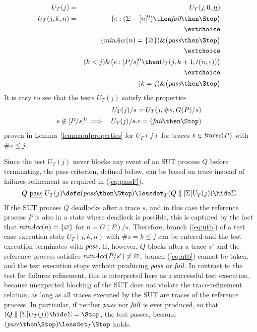 \begin{eqnarray}
U_T(j) & = & U_T(j,0,\ii n)
\\
U_T(j,k,n) & = & \big(  e:(\Sigma - [n]^0)   \then \efail\then \Stop \big)
\label{eq:uta}
\\ & & \extchoice \nonumber
\\ & & (\minaccs(n) = \{ \varnothing \})   \&   \big( \epass \then \Stop \big)
\label{eq:utb}
\\ & & \extchoice \nonumber
\\ & & (k < j) \& \big( e:[P/s]^0   \then U_T(j,k+1,t(n,e)) \big)
\label{eq:utc}
\\ & & \extchoice \nonumber
\\ & & (k = j) \& \big( \epass\then \Stop  \big)
\label{eq:utd}
\end{eqnarray}
%
It is easy to see that the tests $U_T(j)$ satisfy the properties
\begin{eqnarray}
\label{eq:ifpaT}
  &  & U_T(j)/s = U_T(j,\#s,G(P)/s)
\\
\label{eq:ifpbT}
e\not\in [P/s]^0 & \implies & U_T(j)/s.e = (\efail\then\Stop)
\end{eqnarray}
proven in Lemma~\ref{lemma:ufproperties} for $U_F(j)$ for traces
$s\in\text{\it traces}(P)$ with $\#s \le j$.


Since the test $U_T(j)$ never blocks any event of an SUT process $Q$ before
terminating, the pass criterion, defined below, can be based on
trace instead of failures refinement as required in (\ref{eq:passF}).
%
\begin{equation}
\label{eq:passT}
Q\ \pass\ U_T(j) \defs (\epass\then\Stop) \lessdet_T (Q\parallel[\Sigma] U_T(j)) \hide \Sigma
\end{equation}
%
If the SUT process $Q$ deadlocks after a trace $s$, and in this case the
reference process $P$ is also in a state where deadlock is possible, this is
captured by the fact that $\text{\it minAcc}(n) = \{ \varnothing\}$ for $n = G(P)/s$.
Therefore, branch (\ref{eq:utb}) of a test case execution state $U_T(j,k,n)$
with $\#s = k \le j$   can be entered and the  test execution terminates with
${\text{\it pass}}$. If, however, $Q$ blocks after a trace $s'$ and the reference
process satisfies $\text{\it minAcc}(P/s') \neq\varnothing$, branch (\ref{eq:utb})
cannot be taken, and the test execution stops without producing ${\text{\it pass}}$ or
${\text{\it fail}}$. In contrast to the test for failures refinement, this is
interpreted here as a successful test execution, because unexpected blocking
of the SUT does not violate the trace-refinement relation, as long as all
traces executed by the SUT are traces of the reference process. In
particular, if neither ${\text{\it pass}}$ nor ${\text{\it fail}}$ is ever produced, so that
$(Q\parallel[\Sigma] U_T(j)) \hide \Sigma = \Stop$, the test passes, because
$(\epass\then\Stop) \lessdet_T \Stop$ holds.



